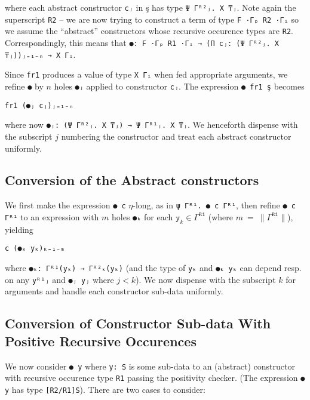 \documentclass{article}
\newcommand{\lenc}[1]{\|#1\|}
\begin{document}
\noindent where each abstract constructor \texttt{cⱼ} in ş has type
\verb;Ψ Γᴿ²ⱼ. X ₸ⱼ;. Note again the superscript \verb;R2; -- we are now trying
to construct a term of type \verb;F ·Γₚ R2 ·Γᵢ; so we assume the ``abstract''
constructors whose recursive occurence types are \verb;R2;. Correspondingly,
this means that \verb;●: F ·Γₚ R1 ·Γᵢ → (Π cⱼ: (Ψ Γᴿ²ⱼ. X ₸ⱼ))ⱼ₌₁₋ₙ → X Γᵢ;.

Since \verb;fr1; produces a value of type \verb;X Γᵢ; when fed appropriate
arguments, we refine \verb;●; by $n$ holes \verb;●ⱼ; applied to constructor
\verb;cⱼ;. The expression \verb;● fr1 ş; becomes

\begin{verbatim}
fr1 (●ⱼ cⱼ)ⱼ₌₁₋ₙ
\end{verbatim}

\noindent where now \verb;●ⱼ: (Ψ Γᴿ²ⱼ. X ₸ⱼ) → Ψ Γᴿ¹ⱼ. X ₸ⱼ;. We henceforth
dispense with the subscript $j$ numbering the constructor and treat each
abstract constructor uniformly.

\subsection{Conversion of the Abstract constructors}
We first make the expression \verb;● c; $\eta$-long, as in \verb;ψ Γᴿ¹. ● c Γᴿ¹;,
then refine \verb;● c Γᴿ¹; to an expression with $m$ holes \verb;●ₖ; for each $\texttt{y}_k \in
Γ^{\texttt{R1}}$ (where $m\ =\ \lenc{Γ^{\texttt{R1}}}$), yielding

\begin{verbatim}
c (●ₖ yₖ)ₖ₌₁₋ₘ
\end{verbatim}

\noindent where \verb;●ₖ: Γᴿ¹(yₖ) → Γᴿ²ₖ(yₖ); (and the type of \verb;yₖ;
and \verb;●ₖ yₖ; can depend resp. on any \verb;yᴿ¹ⱼ; and \verb;●ⱼ yⱼ; where
$j < k$). We now dispense with the subscript $k$ for arguments and handle each
constructor sub-data uniformly.

\subsection{Conversion of Constructor Sub-data With Positive Recursive Occurences}
\label{ssec:positive}
We now consider \verb;● y; where \verb;y: S; is some sub-data to an
(abstract) constructor with recursive occurence type \verb;R1; passing the
positivity checker. (The expression \verb;● y; has type \verb;[R2/R1]S;).
There are two cases to consider:
\end{document}
